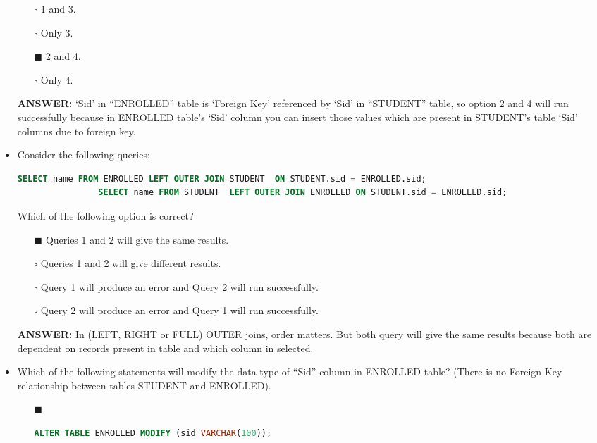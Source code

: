 \documentclass[10pt]{article}
\begin{document}
\begin{itemize}
			\begin{enumerate}
				\item[$\square$] 1 and 3.
				\item[$\square$] Only 3.
				\item[$\blacksquare$] 2 and 4.
				\item[$\square$] Only 4.
			\end{enumerate}
			\color{red} \textbf{ANSWER:} \color{black} ‘Sid’ in “ENROLLED” table is ‘Foreign Key’ referenced by ‘Sid’ in “STUDENT” table, so option 2 and 4 will run successfully because in ENROLLED table’s ‘Sid’ column you can insert those values which are present in STUDENT’s table ‘Sid’ columns due to foreign key.
		
		\item Consider the following queries:
			\begin{lstlisting}[language=SQL,firstline=1, lastline=2] 
				SELECT name FROM ENROLLED LEFT OUTER JOIN STUDENT  ON STUDENT.sid = ENROLLED.sid;
				SELECT name FROM STUDENT  LEFT OUTER JOIN ENROLLED ON STUDENT.sid = ENROLLED.sid;
			\end{lstlisting}
			Which of the following option is correct?
			\begin{enumerate}
				\item[$\blacksquare$] Queries 1 and 2 will give the same results.
				\item[$\square$] Queries 1 and 2 will give different results.
				\item[$\square$] Query 1 will produce an error and Query 2 will run successfully.
				\item[$\square$] Query 2 will produce an error and Query 1 will run successfully.
			\end{enumerate}
			\color{red} \textbf{ANSWER:} \color{black} In (LEFT, RIGHT or FULL) OUTER joins, order matters. But both query will give the same results because both are dependent on records present in table and which column in selected.

		\newpage

		\item Which of the following statements will modify the data type of “Sid” column in ENROLLED table? (There is no Foreign Key relationship between tables STUDENT and ENROLLED).
			\begin{enumerate}
				\item[$\blacksquare$] 
					\begin{lstlisting}[language=SQL,firstline=1, lastline=1, numbers = right] 
						ALTER TABLE ENROLLED MODIFY (sid VARCHAR(100));
					\end{lstlisting}
				

\end{enumerate}
\end{itemize}
\end{document}
